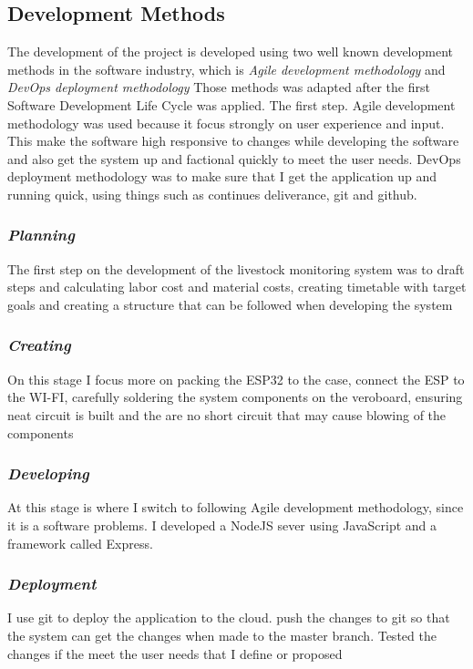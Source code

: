 \subsection{Development Methods}

The development of the project is developed using two well known development methods in the
software industry, which is \textit{Agile development methodology} and \textit{DevOps deployment methodology}
Those methods was adapted after the first Software Development Life Cycle was applied.
The first step. Agile development methodology was used because it focus strongly on user experience
and input. This make the software high responsive to changes while developing the software and also
get the system up and factional quickly to meet the user needs. DevOps deployment methodology was to make
sure that I get the application up and running quick, using things such as continues deliverance, git and github.

\subsubsection{\textit{Planning}}

The first step on the development of the livestock monitoring system was to draft steps and
calculating labor cost and material costs, creating timetable with target goals and creating a
structure that can be followed when developing the system


\subsubsection{\textit{Creating}}

On this stage I focus more on packing the ESP32 to the case, connect the ESP to the WI-FI,
carefully soldering the system components on the veroboard, ensuring neat circuit is built and the are
no short circuit that may cause blowing of the components

\subsubsection{\textit{Developing}}

At this stage is where I switch to following Agile development methodology, since it is
a software problems. I developed a NodeJS sever using JavaScript and a framework called
Express.

\subsubsection{\textit{Deployment}}

I use git to deploy the application to the cloud. push the changes to git so that the system
can get the changes when made to the master branch. Tested the changes if the meet the user
needs that I define or proposed

